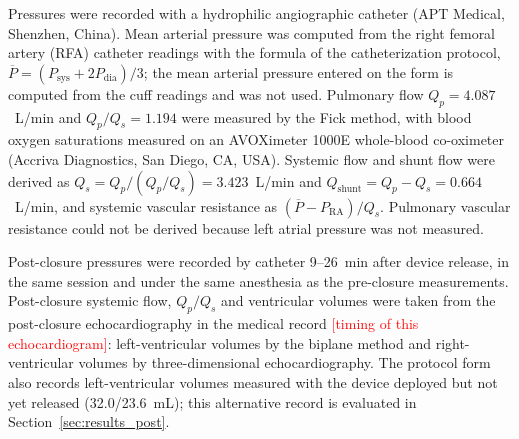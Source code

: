 Pressures were recorded with a hydrophilic angiographic catheter (APT Medical, Shenzhen, China). Mean arterial pressure was computed from the right femoral artery (RFA) catheter readings with the formula of the catheterization protocol, $\overline{P} = (P_{\mathrm{sys}} + 2P_{\mathrm{dia}})/3$; the mean arterial pressure entered on the form is computed from the cuff readings and was not used. Pulmonary flow $Q_p = 4.087$~L/min and $Q_p/Q_s = 1.194$ were measured by the Fick method, with blood oxygen saturations measured on an AVOXimeter 1000E whole-blood co-oximeter (Accriva Diagnostics, San Diego, CA, USA). Systemic flow and shunt flow were derived as $Q_s = Q_p/(Q_p/Q_s) = 3.423$~L/min and $Q_{\mathrm{shunt}} = Q_p - Q_s = 0.664$~L/min, and systemic vascular resistance as $(\overline{P} - P_{\mathrm{RA}})/Q_s$. Pulmonary vascular resistance could not be derived because left atrial pressure was not measured.

Post-closure pressures were recorded by catheter 9--26~min after device release, in the same session and under the same anesthesia as the pre-closure measurements. Post-closure systemic flow, $Q_p/Q_s$ and ventricular volumes were taken from the post-closure echocardiography in the medical record \textcolor{red}{[timing of this echocardiogram]}: left-ventricular volumes by the biplane method and right-ventricular volumes by three-dimensional echocardiography. The protocol form also records left-ventricular volumes measured with the device deployed but not yet released (32.0/23.6~mL); this alternative record is evaluated in Section~\ref{sec:results_post}.


